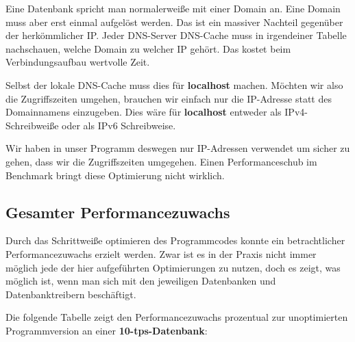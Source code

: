 Eine Datenbank spricht man normalerweiße mit einer Domain an. 
Eine Domain muss aber erst einmal aufgelöst werden.
Das ist ein massiver Nachteil gegenüber der herkömmlicher IP. Jeder
DNS-Server \bzw DNS-Cache muss in irgendeiner Tabelle nachschauen, welche Domain
zu welcher IP gehört. Das kostet beim Verbindungsaufbau wertvolle Zeit.

Selbst der lokale DNS-Cache muss dies \zB für \textbf{localhost} machen.
Möchten wir also die Zugriffszeiten umgehen, brauchen wir einfach nur die IP-Adresse
statt des Domainnamens einzugeben. Dies wäre für \textbf{localhost} entweder  als
IPv4-Schreibweiße oder \gqq{[::1]} als IPv6 Schreibweise.

Wir haben in unser Programm deswegen nur IP-Adressen verwendet um sicher zu gehen, dass wir 
die Zugriffszeiten umgegehen. Einen Performanceschub im
Benchmark bringt diese Optimierung nicht wirklich.

\subsection{Gesamter Performancezuwachs}
Durch das Schrittweiße optimieren des Programmcodes konnte ein betrachtlicher
Performancezuwachs erzielt werden. Zwar ist es in der Praxis nicht immer möglich
jede der hier aufgeführten Optimierungen zu nutzen, doch es zeigt, was möglich
ist, wenn man sich mit den jeweiligen Datenbanken und Datenbanktreibern beschäftigt.

Die folgende Tabelle zeigt den Performancezuwachs prozentual zur unoptimierten
Programmversion an einer \textbf{10-tps-Datenbank}: 



\clearpage